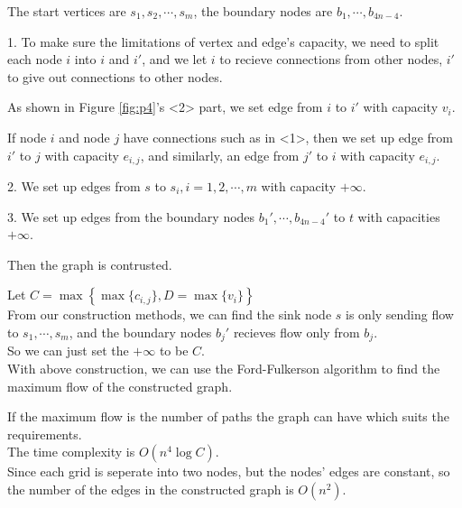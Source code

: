 The start vertices are $s_1,s_2,\cdots,s_m$, the boundary nodes are $b_1,\cdots,b_{4n-4}$.

1. To make sure the limitations of vertex and edge's capacity, we need to split each node $i$ into $i$ and $i'$, and we let $i$ to recieve connections from other nodes, $i'$ to give out connections to other nodes.

As shown in Figure \ref{fig:p4}'s <2> part, we set edge from $i$ to $i'$ with capacity $v_i$.

If node $i$ and node $j$ have connections such as in <1>, then we set up edge from $i'$ to $j$ with capacity $e_{i,j}$, and similarly, an edge from $j'$ to $i$ with capacity $e_{i,j}$.

2. We set up edges from $s$ to $s_i, i=1,2,\cdots,m$ with capacity $+\infty$.

3. We set up edges from the boundary nodes $b_1',\cdots,b_{4n-4}'$ to $t$ with capacities $+\infty$.

Then the graph is contrusted.

Let $C=\max\left\{\max\{c_{i,j}\},D=\max\{v_i\}\right\}$\\
From our construction methods, we can find the sink node $s$ is only sending flow to $s_1,\cdots,s_m$, 
and the boundary nodes $b_j'$ recieves flow only from $b_j$.\\
So we can just set the $+\infty$ to be $C$.\\

With above construction, we can use the Ford-Fulkerson algorithm to find the maximum flow of the constructed graph. 

If the maximum flow is the number of paths the graph can have which suits the requirements.\\
The time complexity is $O(n^4\log C)$.\\
Since each grid is seperate into two nodes, but the nodes' edges are constant, so the number of the edges in the constructed graph is $O(n^2)$.\\

\newpage
